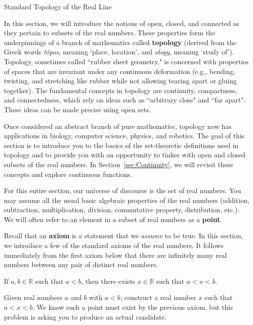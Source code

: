 \begin{section}{Standard Topology of the Real Line}\label{sec:Topology}

In this section, we will introduce the notions of open, closed, and connected as they pertain to subsets of the real numbers.  These properties form the underpinnings of a branch of mathematics called \textbf{topology} (derived from the Greek words \emph{t\'opos}, meaning `place, location', and \emph{ology}, meaning `study of'). Topology, sometimes called ``rubber sheet geometry," is concerned with properties of spaces that are invariant under any continuous deformation (e.g., bending, twisting, and stretching like rubber while not allowing tearing apart or gluing together). The fundamental concepts in topology are continuity, compactness, and connectedness, which rely on ideas such as ``arbitrary close" and ``far apart". These ideas can be made precise using open sets.  

Once considered an abstract branch of pure mathematics, topology now has applications in biology, computer science, physics, and robotics. The goal of this section is to introduce you to the basics of the set-theoretic definitions used in topology and to provide you with an opportunity to tinker with open and closed subsets of the real numbers. In Section~\ref{sec:Continuity}, we will revisit these concepts and explore continuous functions.

For this entire section, our universe of discourse is the set of real numbers.  You may assume all the usual basic algebraic properties of the real numbers (addition, subtraction, multiplication, division, commutative property, distribution, etc.). We will often refer to an element in a subset of real numbers as a \textbf{point}.

Recall that an \textbf{axiom} is a statement that we \emph{assume} to be true.  In this section, we introduce a few of the standard axioms of the real numbers. It follows immediately from the first axiom below that there are infinitely many real numbers between any pair of distinct real numbers.

\begin{axiom} 
If $a,b\in\mathbb{R}$ such that $a<b$, then there exists $x\in\mathbb{R}$ such that $a<x<b$.
\end{axiom}

\begin{problem}
Given real numbers $a$ and $b$ with $a<b$, construct a real number $x$ such that $a<x<b$.  We know such a point must exist by the previous axiom, but this problem is asking you to produce an actual candidate.
\end{problem}


\end{section}
